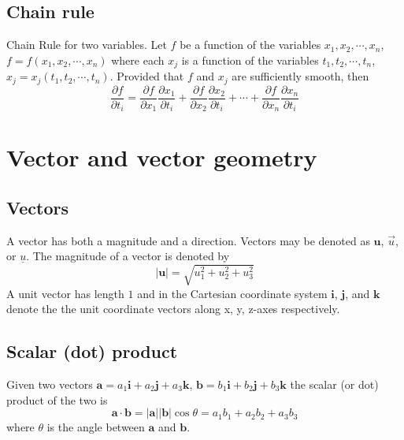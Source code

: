 \documentclass[12pt]{article}
\begin{document}
	\subsection{Chain rule}
	\begin{defn}
		Chain Rule for two variables. Let $f$ be a function of the variables $x_1, x_2, \cdots , x_n$, $f = f(x_1, x_2, \cdots , x_n)$ 
		where each $x_j$ is a function of the variables $t_1, t_2, \cdots , t_n$, $x_j = x_j(t_1, t_2, \cdots , t_n)$. Provided
		that $f$ and $x_j$ are sufficiently smooth, then
		\[
			\frac{\partial f}{\partial t_i} = \frac{\partial f}{\partial x_1}\frac{\partial x_1}{\partial t_i} + 
											\frac{\partial f}{\partial x_2}\frac{\partial x_2}{\partial t_i} + 
											\cdots +
											\frac{\partial f}{\partial x_n}\frac{\partial x_n}{\partial t_i}
		\]
	\end{defn}


\section{Vector and vector geometry}

	\subsection{Vectors}
	\begin{defn}
		A vector has both a magnitude and a direction. Vectors may be denoted as $\mathbf{u}$, $\vec{u}$, or $\underline{u}$.
		The magnitude of a vector is denoted by 
		\[
			|\mathbf{u}| = \sqrt{u_1^2 + u_2^2 + u_3^2}
		\]
		A unit vector has length $1$ and in the Cartesian coordinate system $\mathbf{i}$, $\mathbf{j}$, and $\mathbf{k}$ denote the the unit 
		coordinate vectors along x, y, z-axes respectively.
	\end{defn}
	
	\subsection{Scalar (dot) product}
	\begin{defn}
		Given two vectors $\mathbf{a} = a_1 \mathbf{i} + a_2 \mathbf{j} + a_3 \mathbf{k}$,
		$\mathbf{b} = b_1 \mathbf{i} + b_2 \mathbf{j} + b_3 \mathbf{k}$ the scalar (or dot) product of the two is
		\[
			\mathbf{a} \cdot \mathbf{b} = |\mathbf{a}||\mathbf{b}|\cos{\theta} = a_1 b_1 + a_2 b_2 + a_3 b_3
		\]
		where $\theta$ is the angle between $\mathbf{a}$ and $\mathbf{b}$.
	\end{defn}
	
\end{document}
